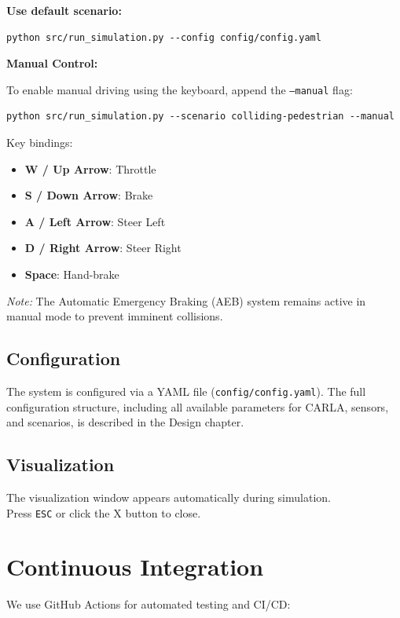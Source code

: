 \textbf{Use default scenario:}

\begin{verbatim}
python src/run_simulation.py --config config/config.yaml
\end{verbatim}

\textbf{Manual Control:}

To enable manual driving using the keyboard, append the \texttt{--manual} flag:

\begin{verbatim}
python src/run_simulation.py --scenario colliding-pedestrian --manual
\end{verbatim}

Key bindings:
\begin{itemize}
    \item \textbf{W / Up Arrow}: Throttle
    \item \textbf{S / Down Arrow}: Brake
    \item \textbf{A / Left Arrow}: Steer Left
    \item \textbf{D / Right Arrow}: Steer Right
    \item \textbf{Space}: Hand-brake
\end{itemize}
\textit{Note:} The Automatic Emergency Braking (AEB) system remains active in manual mode to prevent imminent collisions.

\subsection{Configuration}

The system is configured via a YAML file (\texttt{config/config.yaml}). The full configuration structure, including all available parameters for CARLA, sensors, and scenarios, is described in the Design chapter.

\subsection{Visualization}

The visualization window appears automatically during simulation.\\ Press \texttt{ESC} or click the X button to close.

\section{Continuous Integration}

We use GitHub Actions for automated testing and CI/CD:

